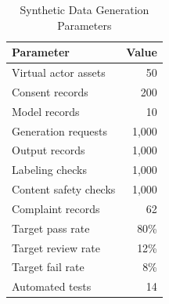 \begin{table}[H]
\centering
\caption{Synthetic Data Generation Parameters}
\label{tab:synthetic-protocol}
\footnotesize
\begin{tabular}{@{}lr@{}}
\toprule
Parameter & Value \\
\midrule
Virtual actor assets & 50 \\
Consent records & 200 \\
Model records & 10 \\
Generation requests & 1,000 \\
Output records & 1,000 \\
Labeling checks & 1,000 \\
Content safety checks & 1,000 \\
Complaint records & 62 \\
Target pass rate & 80\% \\
Target review rate & 12\% \\
Target fail rate & 8\% \\
Automated tests & 14 \\
\bottomrule
\end{tabular}
\end{table}
